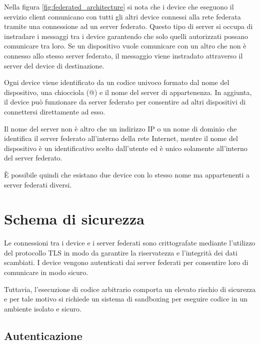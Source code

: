 Nella figura \ref{fig:federated_architecture} si nota che i device che eseguono il servizio client comunicano
con tutti gli altri device connessi alla rete federata tramite una connessione ad un server federato.
Questo tipo di server si occupa di instradare i messaggi tra i device garantendo che solo quelli autorizzati possano comunicare tra loro.
Se un dispositivo vuole comunicare con un altro che non è connesso allo stesso server federato, il messaggio viene instradato attraverso il server del device di destinazione.

Ogni device viene identificato da un codice univoco formato dal nome del dispositivo, una chiocciola (@) e il nome del server di appartenenza.
In aggiunta, il device può funzionare da server federato per consentire ad altri dispositivi di connettersi direttamente ad esso.

Il nome del server non è altro che un indirizzo IP o un nome di dominio che identifica il server federato all'interno della rete Internet,
mentre il nome del dispositivo è un identificativo scelto dall'utente ed è unico solamente all'interno del server federato.

È possibile quindi che esistano due device con lo stesso nome ma appartenenti a server federati diversi.

\section{Schema di sicurezza}

Le connessioni tra i device e i server federati sono crittografate mediante l'utilizzo del protocollo TLS in modo da garantire la riservatezza e l'integrità dei dati scambiati.
I device vengono autenticati dai server federati per consentire loro di comunicare in modo sicuro.

Tuttavia, l'esecuzione di codice arbitrario comporta un elevato rischio di sicurezza e per tale motivo si richiede 
un sistema di sandboxing per eseguire codice in un ambiente isolato e sicuro.

\subsection{Autenticazione}


